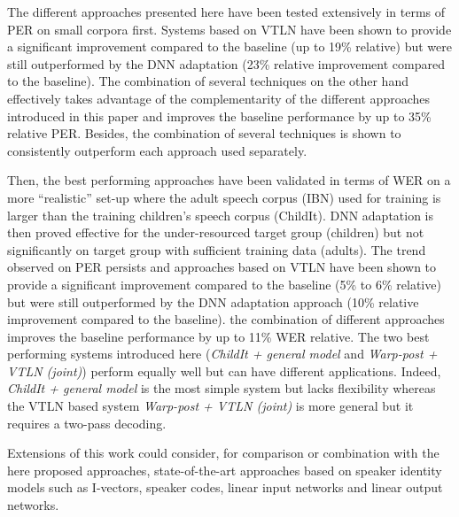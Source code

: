 \documentclass{nle}
\begin{document}
The different approaches presented here have been tested extensively in terms of PER on small corpora first. Systems based on VTLN have been shown to provide a significant improvement compared to the baseline (up to 19\% relative) but were still outperformed by the DNN adaptation (23\% relative improvement compared to the baseline). The combination of several techniques on the other hand effectively takes advantage of the complementarity of the different approaches introduced in this paper and improves the baseline performance by up to 35\% relative PER. Besides, the combination of several techniques is shown to consistently outperform each approach used separately.

Then, the best performing approaches have been validated in terms of WER on a more ``realistic'' set-up where the adult speech corpus (IBN) used for training is larger than the training children's speech corpus (ChildIt). DNN adaptation is then proved effective for the  under-resourced target group (children) but not significantly on target group with sufficient training data (adults). The trend observed on PER persists and approaches based on VTLN have been shown to provide a significant improvement compared to the baseline (5\% to 6\% relative) but were still outperformed by the DNN adaptation approach (10\% relative improvement compared to the baseline). the combination of different approaches improves the baseline performance by up to 11\% WER relative. The two best performing systems introduced here ({\em ChildIt + general model} and {\em Warp-post + VTLN (joint)}) perform equally well but can have different applications. Indeed, {\em ChildIt + general model} is the most simple system but lacks flexibility  whereas the VTLN based system {\em Warp-post + VTLN (joint)} is more general but it requires a two-pass decoding.

%
%
Extensions   of  this   work  could   consider,  for   comparison  or
combination  with  the  here  proposed  approaches,  state-of-the-art
approaches based on speaker identity models such as 
I-vectors,  speaker codes,  linear input
networks  and  linear  output  networks.

\end{document}
